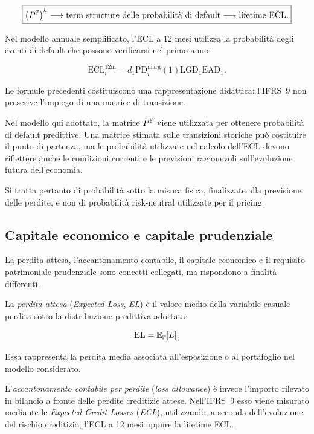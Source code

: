 \[
\boxed{
\left(P^{\mathbb{P}}\right)^h
\longrightarrow
\text{term structure delle probabilit\`{a} di default}
\longrightarrow
\text{lifetime ECL}.
}
\]

Nel modello annuale semplificato, l'ECL a 12 mesi utilizza la
probabilit\`{a} degli eventi di default che possono verificarsi nel
primo anno:

\[
\mathrm{ECL}_{i}^{12\mathrm{m}}
=
d_1
\mathrm{PD}_{i}^{\mathrm{marg}}(1)
\mathrm{LGD}_1
\mathrm{EAD}_1.
\]

Le formule precedenti costituiscono una rappresentazione didattica:
l'IFRS~9 non prescrive l'impiego di una matrice di transizione.

Nel modello qui adottato, la matrice $P^{\mathbb{P}}$ viene utilizzata per
ottenere probabilit\`{a} di default predittive. Una matrice stimata
sulle transizioni storiche pu\`{o} costituire il punto di partenza, ma
le probabilit\`{a} utilizzate nel calcolo dell'ECL devono riflettere
anche le condizioni correnti e le previsioni ragionevoli
sull'evoluzione futura dell'economia.

Si tratta pertanto di probabilit\`{a} sotto la misura fisica, finalizzate
alla previsione delle perdite, e non di probabilit\`{a} risk-neutral
utilizzate per il pricing.

\subsection{Capitale economico e capitale prudenziale}

\label{subsec:cap9-capitale-economico-prudenziale}

La perdita attesa, l'accantonamento contabile, il capitale economico
e il requisito patrimoniale prudenziale sono concetti collegati, ma
rispondono a finalit\`{a} differenti.

La \emph{perdita attesa} (\emph{Expected Loss}, \emph{EL}) \`{e} il
valore medio della variabile casuale perdita sotto la distribuzione
predittiva adottata:

\[
\mathrm{EL}
=
\mathbb{E}_{\mathbb{P}}[L].
\]

Essa rappresenta la perdita media associata all'esposizione o al
portafoglio nel modello considerato.

L'\emph{accantonamento contabile per perdite}
(\emph{loss allowance}) \`{e} invece l'importo rilevato in bilancio
a fronte delle perdite creditizie attese. Nell'IFRS~9 esso viene
misurato mediante le \emph{Expected Credit Losses} (\emph{ECL}),
utilizzando, a seconda dell'evoluzione del rischio creditizio, l'ECL
a 12 mesi oppure la lifetime ECL.

